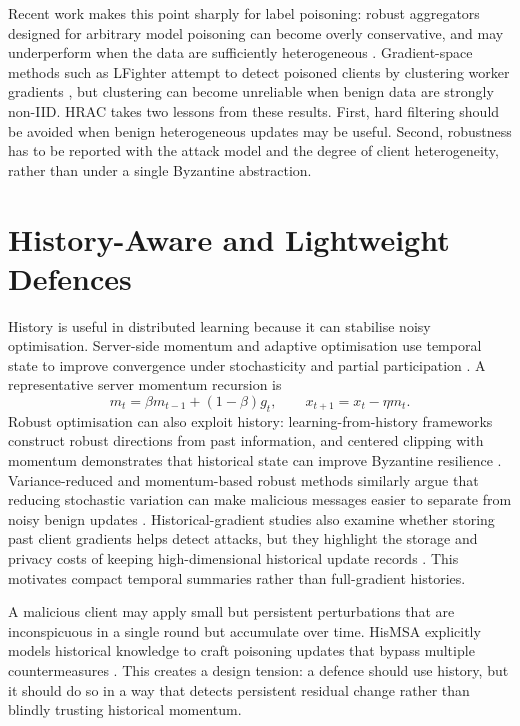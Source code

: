 Recent work makes this point sharply for label poisoning: robust aggregators
designed for arbitrary model poisoning can become overly conservative, and may
underperform when the data are sufficiently heterogeneous
\cite{JMLR:v26:24-1307}. Gradient-space methods such as LFighter attempt to
detect poisoned clients by clustering worker gradients \cite{JEBREEL2024111},
but clustering can become unreliable when benign data are strongly non-IID.
HRAC takes two lessons from these results. First, hard filtering should be
avoided when benign heterogeneous updates may be useful. Second, robustness has
to be reported with the attack model and the degree of client heterogeneity,
rather than under a single Byzantine abstraction.

\section{History-Aware and Lightweight Defences}

History is useful in distributed learning because it can stabilise noisy
optimisation. Server-side momentum and adaptive optimisation use temporal state
to improve convergence under stochasticity and partial participation
\cite{reddi2021adaptive}. A representative server momentum recursion is
\begin{equation}
    m_t = \beta m_{t-1} + (1-\beta) g_t,
    \qquad
    x_{t+1}=x_t-\eta m_t .
    \label{eq:related-momentum}
\end{equation}
Robust optimisation can also exploit history: learning-from-history frameworks
construct robust directions from past information, and centered clipping with
momentum demonstrates that historical state can improve Byzantine resilience
\cite{pmlr-v139-karimireddy21a}.
Variance-reduced and momentum-based robust methods similarly argue that
reducing stochastic variation can make malicious messages easier to separate
from noisy benign updates \cite{wu2020byrdsaga,farhadkhani2022resam}.
Historical-gradient studies also examine whether storing past client gradients
helps detect attacks, but they highlight the storage and privacy costs of
keeping high-dimensional historical update records
\cite{choi2024historicalgradients}. This motivates compact temporal summaries
rather than full-gradient histories.

A malicious client may
apply small but persistent perturbations that are inconspicuous in a single
round but accumulate over time. HisMSA explicitly models historical knowledge
to craft poisoning updates that bypass multiple countermeasures
\cite{ZhangHisMSA:2025}. This creates a design tension: a defence should use
history, but it should do so in a way that detects persistent residual change
rather than blindly trusting historical momentum.


